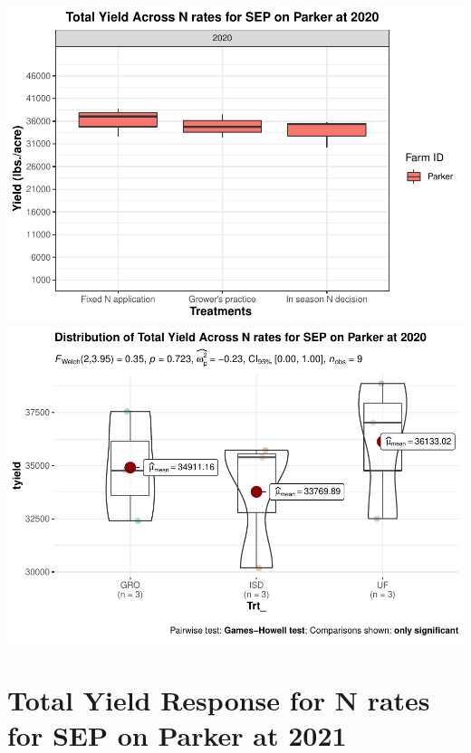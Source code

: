 \documentclass[
]{article}
\begin{document}
\includegraphics{NoffsiteT_files/figure-latex/unnamed-chunk-6-1.pdf}
\includegraphics{NoffsiteT_files/figure-latex/unnamed-chunk-6-2.pdf}

\hypertarget{total-yield-response-for-n-rates-for-sep-on-parker-at-2021}{%
\section{Total Yield Response for N rates for SEP on Parker at
2021}\label{total-yield-response-for-n-rates-for-sep-on-parker-at-2021}}
\end{document}
